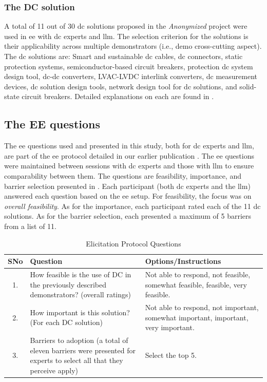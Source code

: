 \documentclass[manuscript,review,anonymous]{acmart}
\begin{document}
\subsubsection{The DC solution}
A total of 11 out of 30 \gls{dc} solutions proposed in the \textit{Anonymized} project were used in \gls{ee} with \gls{dc} experts and \gls{llm}. The selection criterion for the solutions is their applicability across multiple demonstrators (i.e., demo cross-cutting aspect). The \gls{dc} solutions are: Smart and sustainable \gls{dc} cables, \gls{dc} connectors, static protection systems, semiconductor-based circuit breakers, protection \gls{dc} system design tool, \gls{dc}-\gls{dc} converters, LVAC-LVDC interlink converters, \gls{dc} measurement devices, \gls{dc} solution design tools, network design tool for \gls{dc} solutions, and solid-state circuit breakers. Detailed explanations on each are found in \cite{anonymized2025_ShiftingCurrents}.

\subsection{The EE questions}
The \gls{ee} questions used and presented in this study, both for \gls{dc} experts and \gls{llm}, are part of the \gls{ee} protocol detailed in our earlier publication \cite{anonymized2025_ShiftingCurrents}. The \gls{ee} questions were maintained between sessions with \gls{dc} experts and those with \gls{llm} to ensure comparability between them. The questions are feasibility, importance, and barrier selection presented in . Each participant (both \gls{dc} experts and the \gls{llm}) answered each question based on the \gls{ee} setup. For feasibility, the focus was on \textit{overall feasibility}. As for the importance, each participant rated each of the 11 \gls{dc} solutions. As for the barrier selection, each presented a maximum of 5 barriers from a list of 11. 

\begin{table}[h!]
\centering
\caption{Elicitation Protocol Questions}
\vspace{-1em}
\label{tab:protocol-questions}
\small
\begin{tabular}{c p{7cm} p{5cm}}
\hline
SNo & Question & Options/Instructions \\
\hline
1. & How feasible is the use of DC in the previously described demonstrators? (overall ratings) & Not able to respond, not feasible, somewhat feasible, feasible, very feasible. \\
2. & How important is this solution? (For each DC solution) & Not able to respond, not important, somewhat important, important, very important. \\
3. & Barriers to adoption (a total of eleven barriers were presented for experts to select all that they perceive apply) & Select the top 5. \\
\hline
\end{tabular}
\end{table}
\end{document}
